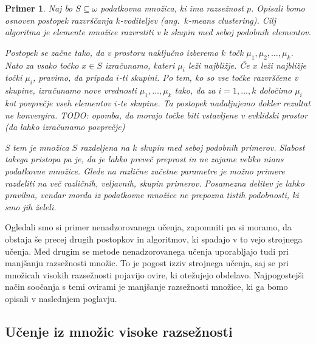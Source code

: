 \documentclass[12pt,a4paper]{article}
\newtheorem{primer}{Primer}
\begin{document}
\begin{primer}
Naj bo $S \subseteq \omega$ podatkovna množica, ki ima razsežnost $p$. 
Opisali bomo osnoven postopek razvrščanja $k$-voditeljev (ang.~$k$-means clustering). 
Cilj algoritma je elemente množice razvrstiti v $k$ skupin med seboj podobnih elementov.


Postopek se začne tako, da v prostoru naključno izberemo $k$ točk $\mu_1, \mu_2, \ldots , \mu_k$. 
Nato za vsako točko $x \in S$ izračunamo, kateri $\mu_i$ leži najbližje. Če $x$ leži najbližje točki $\mu_i$, pravimo, da pripada $i$-ti skupini. 
Po tem, ko so vse točke razvrščene v skupine, izračunamo nove vrednosti $\mu_1, \ldots , \mu_k$ tako, da za $i=1,\ldots,k$ določimo $\mu_i$ kot povprečje vseh elementov $i$-te skupine. 
Ta postopek nadaljujemo dokler rezultat ne konvergira. TODO: opomba, da morajo točke biti vstavljene v evklidski prostor (da lahko izračunamo povprečje)

S tem je množica $S$ razdeljena na $k$ skupin med seboj podobnih primerov. 
Slabost takega pristopa pa je, da je lahko preveč preprost in ne zajame veliko nians podatkovne množice. 
Glede na različne začetne parametre je možno primere razdeliti na več različnih, veljavnih, skupin primerov. 
Posamezna delitev je lahko pravilna, vendar morda iz podatkovne množice ne prepozna tistih podobnosti, ki smo jih želeli.
\end{primer}


Ogledali smo si primer nenadzorovanega učenja, zapomniti pa si moramo, da obstaja še precej drugih postopkov in algoritmov, ki spadajo v to vejo strojnega učenja. 
Med drugim se metode nenadzorovanega učenja uporabljajo tudi pri manjšanju razsežnosti množic. 
To je pogost izziv strojnega učenja, saj se pri množicah visokih razsežnosti pojavijo ovire, ki otežujejo obdelavo. 
Najpogostejši način soočanja s temi ovirami je manjšanje razsežnosti množice, ki ga bomo opisali v naslednjem poglavju.



\subsection{Učenje iz množic visoke razsežnosti}
\end{document}
